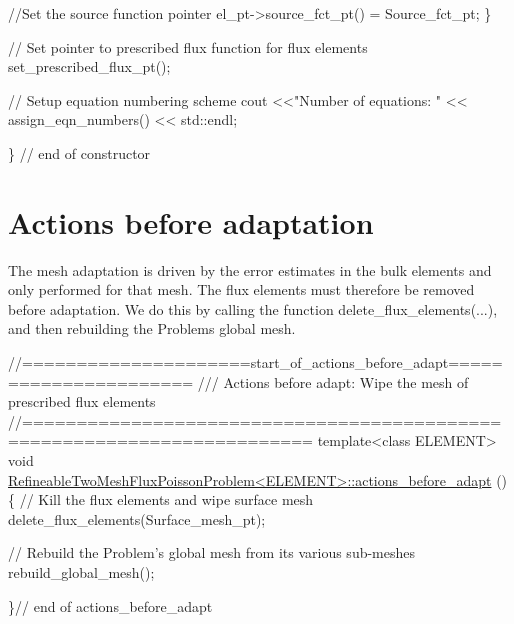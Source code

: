 \begin{DoxyCodeInclude}
   \textcolor{comment}{//Set the source function pointer}
   el\_pt->source\_fct\_pt() = Source\_fct\_pt;
  \}

 \textcolor{comment}{// Set pointer to prescribed flux function for flux elements}
 set\_prescribed\_flux\_pt();

 \textcolor{comment}{// Setup equation numbering scheme}
 cout <<\textcolor{stringliteral}{"Number of equations: "} << assign\_eqn\_numbers() << std::endl; 

\} \textcolor{comment}{// end of constructor}

\end{DoxyCodeInclude}




 

\hypertarget{index_before_adapt}{}\section{Actions before adaptation}\label{index_before_adapt}
The mesh adaptation is driven by the error estimates in the bulk elements and only performed for that mesh. The flux elements must therefore be removed before adaptation. We do this by calling the function {\ttfamily delete\+\_\+flux\+\_\+elements}(...), and then rebuilding the {\ttfamily Problem\textquotesingle{}s} global mesh.

 
\begin{DoxyCodeInclude}
\textcolor{comment}{//=====================start\_of\_actions\_before\_adapt======================}
\textcolor{comment}{/// Actions before adapt: Wipe the mesh of prescribed flux elements}
\textcolor{comment}{}\textcolor{comment}{//========================================================================}
\textcolor{keyword}{template}<\textcolor{keyword}{class} ELEMENT>
\textcolor{keywordtype}{void} \hyperlink{classRefineableTwoMeshFluxPoissonProblem_a10d2a67a5ac599161ddcf876b31334f6}{RefineableTwoMeshFluxPoissonProblem<ELEMENT>::actions\_before\_adapt}
      ()
\{
 \textcolor{comment}{// Kill the flux elements and wipe surface mesh}
 delete\_flux\_elements(Surface\_mesh\_pt);
 
 \textcolor{comment}{// Rebuild the Problem's global mesh from its various sub-meshes}
 rebuild\_global\_mesh();

\}\textcolor{comment}{// end of actions\_before\_adapt}

\end{DoxyCodeInclude}




